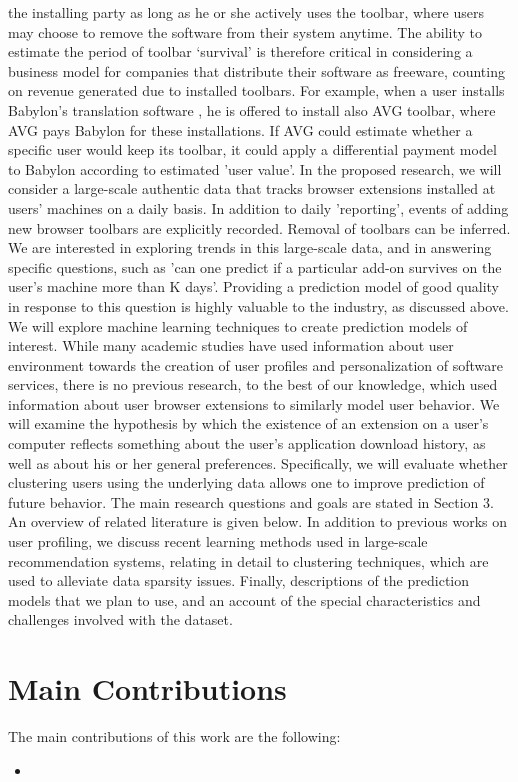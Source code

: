 \documentclass[11pt,oneside]{book}
\let\Oldsection\section
\renewcommand{\section}{\FloatBarrier\Oldsection}
\begin{document}
the installing party as long as he or she actively uses the toolbar, where users may choose to remove the software from their system anytime. The ability to estimate the period of toolbar ‘survival’ is therefore critical in considering a business model for companies that distribute their software as freeware, counting on revenue generated due to installed toolbars. For example, when a user installs Babylon's translation software , he is offered to install also AVG toolbar, where AVG pays Babylon for these installations. If AVG could estimate whether a specific user would keep its toolbar, it could apply a differential payment model to Babylon according to estimated 'user value'.  In the proposed research, we will consider a large-scale authentic data that tracks browser extensions installed at users' machines on a daily basis. In addition to daily 'reporting', events of adding new browser toolbars are explicitly recorded. Removal
of toolbars can be inferred. We are interested in exploring trends in this large-scale data, and in answering specific questions, such as 'can one predict if a particular add-on survives on the user's machine
more than K days'. Providing a prediction model of good quality in response to this question is highly valuable to the industry, as discussed above. We will explore machine learning techniques to create prediction models of interest. While many academic studies have used information about user environment towards the creation of user
profiles and personalization of software services, there is no previous research, to the best of our knowledge, which used information about user browser extensions to similarly model user behavior. We will examine the hypothesis by which the existence of an extension on a user’s computer reflects something about the user's
application download history, as well as about his or her general preferences. Specifically, we will evaluate whether clustering users using the underlying data allows one to improve prediction of future behavior. The main research questions and goals are stated in Section 3. An overview of related literature is given below. In addition to previous works on user profiling, we discuss recent learning methods used in large-scale recommendation systems, relating in detail to clustering techniques, which are used to alleviate data sparsity
issues. Finally, descriptions of the prediction models that we plan to use, and an account of the special characteristics and challenges involved with the dataset.


\section{Main Contributions}
\label{sub:contributions}
The main contributions of this work are the following:
\begin{itemize}
\renewcommand{\labelitemi}{$\bullet$} 
\item 
\end{itemize}
\end{document}
